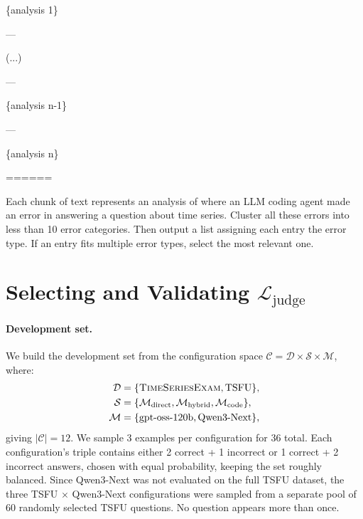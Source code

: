 \documentclass[11pt]{article}
\newcommand{\ljudge}{$\mathcal{L}_{\text{judge}}$}
\newcommand{\mmdirect}{\mathcal{M}_{\text{direct}}}
\newcommand{\mmcode}{\mathcal{M}_{\text{code}}}
\newcommand{\mmhybrid}{\mathcal{M}_{\text{hybrid}}}
\begin{document}
\begingroup
\footnotesize
\centering
\begin{prompttextbox}
\begingroup
\ttfamily
\small
\sloppy
\obeyspaces
\{analysis 1\}\par
\par
---\par
\par
(...)\par
\par
---\par
\par
\{analysis n-1\}\par
\par
---\par
\par
\{analysis n\}\par
\par
======\par
\par
Each chunk of text represents an analysis of where an LLM coding agent made an error in answering a question about time series. Cluster all these errors into less than 10 error categories. Then output a list assigning each entry the error type. If an entry fits multiple error types, select the most relevant one.\par
\endgroup
\end{prompttextbox}\par
\captionsetup{hypcap=false}
\label{fig:prompt_clustering}
\endgroup

\section{Selecting and Validating \ljudge{}}
\label{app:judge_selection}

\paragraph{Development set.}
We build the development set from the configuration space $\mathcal{C} = \mathcal{D} \times \mathcal{S} \times \mathcal{M}$, where:
\begin{align*}
    \mathcal{D} &= \{\textsc{TimeSeriesExam}, \text{TSFU}\}, \\
    \mathcal{S} &= \{\mmdirect, \mmhybrid, \mmcode\}, \\
    \mathcal{M} &= \{\text{gpt-oss-120b}, \text{Qwen3-Next}\},
\end{align*}
giving $|\mathcal{C}| = 12$. We sample 3 examples per configuration for 36 total. Each configuration's triple contains either 2 correct + 1 incorrect or 1 correct + 2 incorrect answers, chosen with equal probability, keeping the set roughly balanced. Since Qwen3-Next was not evaluated on the full TSFU dataset, the three TSFU $\times$ Qwen3-Next configurations were sampled from a separate pool of 60 randomly selected TSFU questions. No question appears more than once.
\end{document}

